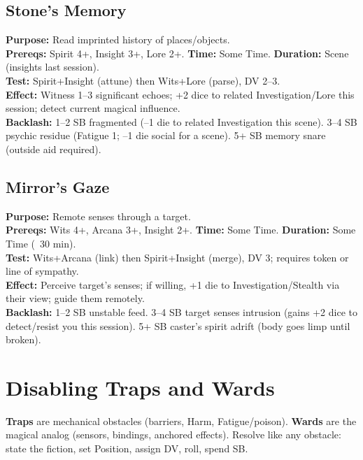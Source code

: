 \subsection*{Stone's Memory}
\textbf{Purpose:} Read imprinted history of places/objects.\\
\textbf{Prereqs:} Spirit 4+, Insight 3+, Lore 2+. \quad \textbf{Time:} Some Time. \quad \textbf{Duration:} Scene (insights last session).\\
\textbf{Test:} Spirit+Insight (attune) then Wits+Lore (parse), DV 2--3.\\
\textbf{Effect:} Witness 1--3 significant echoes; +2 dice to related Investigation/Lore this session; detect current magical influence.\\
\textbf{Backlash:} 1--2 SB fragmented (--1 die to related Investigation this scene). 3--4 SB psychic residue (Fatigue 1; --1 die social for a scene). 5+ SB memory snare (outside aid required).

\subsection*{Mirror's Gaze}
\textbf{Purpose:} Remote senses through a target.\\
\textbf{Prereqs:} Wits 4+, Arcana 3+, Insight 2+. \quad \textbf{Time:} Some Time. \quad \textbf{Duration:} Some Time (~30 min).\\
\textbf{Test:} Wits+Arcana (link) then Spirit+Insight (merge), DV 3; requires token or line of sympathy.\\
\textbf{Effect:} Perceive target's senses; if willing, +1 die to Investigation/Stealth via their view; guide them remotely.\\
\textbf{Backlash:} 1--2 SB unstable feed. 3--4 SB target senses intrusion (gains +2 dice to detect/resist you this session). 5+ SB caster's spirit adrift (body goes limp until broken).

\newpage
\section{Disabling Traps and Wards}\label{sec:disabling_wards}

\textbf{Traps} are mechanical obstacles (barriers, Harm, Fatigue/poison). \textbf{Wards} are the magical analog (sensors, bindings, anchored effects). Resolve like any obstacle: state the fiction, set Position, assign DV, roll, spend SB.

